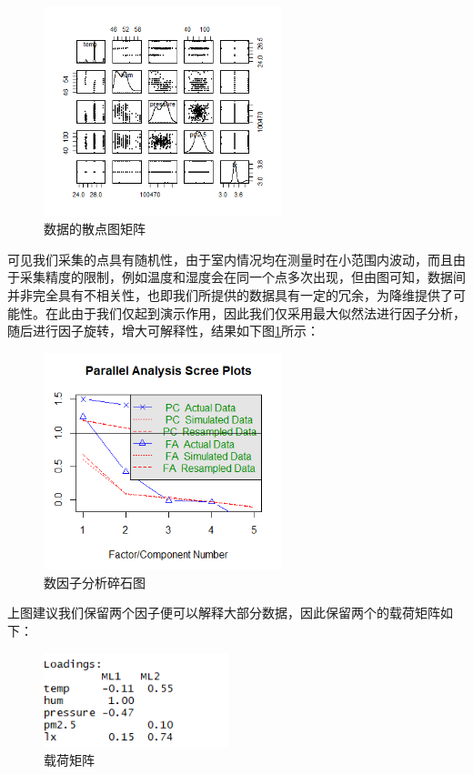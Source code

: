\documentclass[a4paper, 11pt]{article} %
\begin{document}
\begin{figure}[H]
  \centering
  \includegraphics[width = 0.618\textwidth]{R.png}
  \caption{数据的散点图矩阵}
\end{figure}

可见我们采集的点具有随机性，由于室内情况均在测量时在小范围内波动，而且由于采集精度的限制，例如温度和湿度会在同一个点多次出现，但由图可知，数据间并非完全具有不相关性，也即我们所提供的数据具有一定的冗余，为降维提供了可能性。在此由于我们仅起到演示作用，因此我们仅采用最大似然法进行因子分析，随后进行因子旋转，增大可解释性，结果如下图\ref{imgk}所示：
\begin{figure}[H]
  \centering
  \includegraphics[width = 0.618\textwidth]{R1.png}
  \caption{数因子分析碎石图}
  \label{imgk}
\end{figure}

上图建议我们保留两个因子便可以解释大部分数据，因此保留两个的载荷矩阵如下：

\begin{figure}[H]
  \centering
  \includegraphics[width = 0.48\textwidth]{faloading.png}
  \caption{载荷矩阵}
\end{figure}
\end{document}

